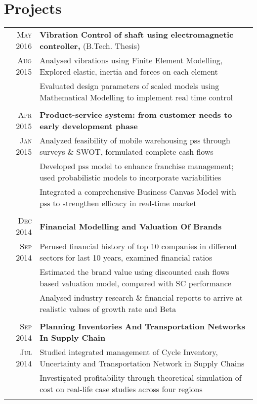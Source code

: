 \documentclass[a4paper,10pt]{article}
\begin{document}
\section{Projects}
\begin{tabular}{r|p{18cm}}

\textsc{May 2016} & \textbf{Vibration Control of shaft using electromagnetic controller,} (B.Tech. Thesis)\\
\textsc{Aug 2015} & Analysed vibrations using Finite Element Modelling, Explored elastic, inertia and forces on each element\\
& Evaluated design parameters of scaled models using Mathematical Modelling to implement real time control\\\multicolumn{2}{c}{}\\

\textsc{Apr 2015} & \textbf{Product-service system: from customer needs to early development phase}\\
\textsc{Jan 2015} & Analyzed feasibility of mobile warehousing pss through surveys \& SWOT, formulated complete cash flows\\
& Developed pss model to enhance franchise management; used probabilistic models to incorporate variabilities\\
& Integrated a comprehensive Business Canvas Model with pss to strengthen efficacy in real-time market\\\multicolumn{2}{c}{}\\

\textsc{Dec 2014} & \textbf{Financial Modelling and Valuation Of Brands}\\
\textsc{Sep 2014} & Perused financial history of top 10 companies in different sectors for last 10 years, examined financial ratios\\
& Estimated the brand value using discounted cash flows based valuation model, compared with SC performance\\
& Analysed industry research \& financial reports to arrive at realistic values of growth rate and Beta\\\multicolumn{2}{c}{}\\

\textsc{Sep 2014} & \textbf{Planning Inventories And Transportation Networks In Supply Chain}\\
\textsc{Jul 2014} & Studied integrated management of Cycle Inventory, Uncertainty and Transportation Network in Supply Chains\\
& Investigated profitability through theoretical simulation of cost on real-life case studies across four regions\\\multicolumn{2}{c}{}\\


\end{tabular}
\end{document}
